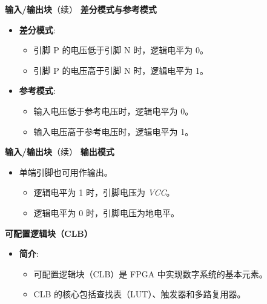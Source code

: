 \documentclass[
  ignorenonframetext,
  chinese,
]{beamer}
\providecommand{\tightlist}{%
  \setlength{\itemsep}{0pt}\setlength{\parskip}{0pt}}
\begin{document}
\begin{frame}
\begin{block}{\textbf{输入/输出块}（续）}
\textbf{差分模式与参考模式}
\begin{itemize}
\tightlist
\item \textbf{差分模式}:
\begin{itemize}
\tightlist
\item 引脚 P 的电压低于引脚 N 时，逻辑电平为 0。
\item 引脚 P 的电压高于引脚 N 时，逻辑电平为 1。
\end{itemize}
\item \textbf{参考模式}:
\begin{itemize}
\tightlist
\item 输入电压低于参考电压时，逻辑电平为 0。
\item 输入电压高于参考电压时，逻辑电平为 1。
\end{itemize}
\end{itemize}
\end{block}
\end{frame}

\begin{frame}
\begin{block}{\textbf{输入/输出块}（续）}
\textbf{输出模式}
\begin{itemize}
\tightlist
\item 单端引脚也可用作输出。
\begin{itemize}
\tightlist
\item 逻辑电平为 1 时，引脚电压为 \emph{VCC}。
\item 逻辑电平为 0 时，引脚电压为地电平。
\end{itemize}
\end{itemize}
\end{block}
\end{frame}

\begin{frame}
\begin{block}{\textbf{可配置逻辑块（CLB）}}
\label{ux53efux914dux7f6eux903bux8f91ux5757clb}
\begin{itemize}
\tightlist
\item \textbf{简介}:
\begin{itemize}
\tightlist
\item 可配置逻辑块（CLB）是 FPGA 中实现数字系统的基本元素。
\item CLB 的核心包括查找表（LUT）、触发器和多路复用器。
\end{itemize}
\end{itemize}
\end{block}
\end{frame}
\end{document}
